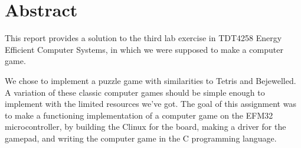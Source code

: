 \section{Abstract}

This report provides a solution to the third lab exercise in TDT4258 Energy Efficient Computer Systems, in which we were supposed to make a computer game.

We chose to implement a puzzle game with similarities to Tetris and Bejewelled.
A variation of these classic computer games should be simple enough to implement with the limited resources we've got. The goal of this assignment was to make a functioning implementation of a computer game on the EFM32 microcontroller, by building the \si{\micro} Clinux for the board, making a driver for the gamepad, and writing the computer game in the C programming language.
